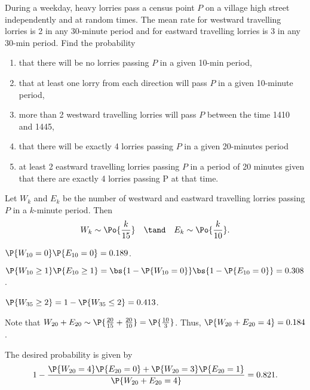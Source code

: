 \begin{problem}
    During a weekday, heavy lorries pass a census point $P$ on a village high street independently and at random times. The mean rate for westward travelling lorries is 2 in any 30-minute period and for eastward travelling lorries is 3 in any 30-min period. Find the probability

    \begin{enumerate}
        \item that there will be no lorries passing $P$ in a given 10-min period,
        \item that at least one lorry from each direction will pass $P$ in a given 10-minute period,
        \item more than 2 westward travelling lorries will pass $P$ between the time 1410 and 1445,
        \item that there will be exactly 4 lorries passing $P$ in a given 20-minutes period
        \item at least 2 eastward travelling lorries passing $P$ in a period of 20 minutes given that there are exactly 4 lorries passing P at that time.
    \end{enumerate}
\end{problem}
\begin{solution}
    Let $W_k$ and $E_k$ be the number of westward and eastward travelling lorries passing $P$ in a $k$-minute period. Then \[W_k \sim \Po{\frac{k}{15}} \quad \tand \quad E_k \sim \Po{\frac{k}{10}}.\]
    \begin{ppart}
        $\P{W_{10} = 0} \P{E_{10} = 0} = 0.189$.
    \end{ppart}
    \begin{ppart}
        $\P{W_{10} \geq 1} \P{E_{10} \geq 1} = \bs{1 - \P{W_{10} = 0}} \bs{1 - \P{E_{10} = 0}} = 0.308$.
    \end{ppart}
    \begin{ppart}
        $\P{W_{35} \geq 2} = 1 - \P{W_{35} \leq 2} = 0.413$.
    \end{ppart}
    \begin{ppart}
        Note that $W_{20} + E_{20} \sim \P{\frac{20}{15} + \frac{20}{10}} = \P{\frac{10}{3}}$. Thus, $\P{W_{20} + E_{20} = 4} = 0.184$.
    \end{ppart}
    \begin{ppart}
        The desired probability is given by \[1 - \frac{\P{W_{20} = 4}\P{E_{20} = 0} + \P{W_{20} = 3}\P{E_{20} = 1}}{\P{W_{20} + E_{20} = 4}} = 0.821.\]
    \end{ppart}
\end{solution}


